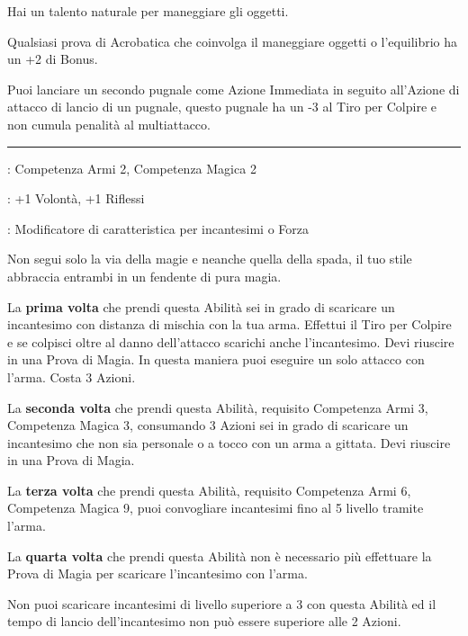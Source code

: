 \begin{multicols}{2}
Hai un talento naturale per maneggiare gli oggetti.

Qualsiasi prova di Acrobatica che coinvolga il maneggiare oggetti o l'equilibrio ha un +2 di Bonus.

Puoi lanciare un secondo pugnale come Azione Immediata in seguito all'Azione di attacco di lancio di un pugnale, questo pugnale ha un -3 al Tiro per Colpire e non cumula penalità al multiattacco.

\smallskip\noindent\rule{\linewidth}{2pt} \hypertarget{Guerriero della Magia}{}\medskip{}
\noindent
\begin{description}[noitemsep, topsep=0pt, parsep=0pt, partopsep=0pt, leftmargin=0cm, labelwidth=2.5cm]
    \item[\textbf{Requisito}]: Competenza Armi 2, Competenza Magica 2
    \item[\textbf{Tiri Salvezza}]: +1 Volontà, +1 Riflessi
    \item[\textbf{Caratteristica}]: Modificatore di caratteristica per incantesimi o Forza
\end{description}

Non segui solo la via della magie e neanche quella della spada, il tuo stile abbraccia entrambi in un fendente di pura magia.

La \textbf{prima volta} che prendi questa Abilità sei in grado di scaricare un incantesimo con distanza di mischia con la tua arma. Effettui il Tiro per Colpire e se colpisci oltre al danno dell'attacco scarichi anche l'incantesimo. Devi riuscire in una Prova di Magia. In questa maniera puoi eseguire un solo attacco con l'arma. Costa 3 Azioni.

La \textbf{seconda volta} che prendi questa Abilità, requisito Competenza Armi 3, Competenza Magica 3, consumando 3 Azioni sei in grado di scaricare un incantesimo che non sia personale o a tocco con un arma a gittata. Devi riuscire in una Prova di Magia.

La \textbf{terza volta} che prendi questa Abilità, requisito Competenza Armi 6, Competenza Magica 9, puoi convogliare incantesimi fino al 5 livello tramite l'arma.

La \textbf{quarta volta} che prendi questa Abilità non è necessario più effettuare la Prova di Magia per scaricare l'incantesimo con l'arma.

Non puoi scaricare incantesimi di livello superiore a 3 con questa Abilità ed il tempo di lancio dell'incantesimo non può essere superiore alle 2 Azioni.


\end{multicols}
